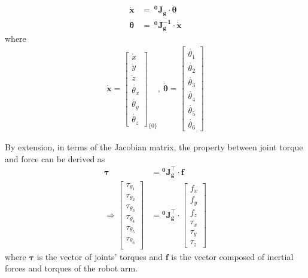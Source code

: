 \begin{equation}
\label{eq:jg0}
\begin{split}
\boldsymbol{\dot{x}} &= \ \mathbf{^0\!J_g} \cdot \boldsymbol{\dot{\theta}} 		\\ 
\boldsymbol{\dot{\theta}} &= \ \mathbf{^0\!J_g^{-1}} \cdot \boldsymbol{\dot{x}}
\end{split}
\end{equation}
where
\begin{equation*}
\begin{split}
\boldsymbol{\dot{x}}
=
\begin{bmatrix}
\dot{x}\\
\dot{y}\\
\dot{z}\\
\dot{\theta _x}\\
\dot{\theta _y}\\
\dot{\theta _z}
\end{bmatrix}_{\!\{0\}}
,\ 
\boldsymbol{\dot{\theta}}
=
\begin{bmatrix}
\dot{\theta _1} \\ 
\dot{\theta _2} \\ 
\dot{\theta _3} \\ 
\dot{\theta _4} \\ 
\dot{\theta _5} \\ 
\dot{\theta _6} 
\end{bmatrix}
\end{split}
\end{equation*}
\par
By extension, in terms of the Jacobian matrix, the property between joint torque and force can be derived as
\begin{equation}
\begin{split}
\boldsymbol{\tau } &= \mathbf{^0\!J^\top _g} \cdot \boldsymbol{f}	\\
\Rightarrow
\begin{bmatrix}
\tau_{\theta _1} \\ 
\tau_{\theta _2} \\ 
\tau_{\theta _3} \\ 
\tau_{\theta _4} \\ 
\tau_{\theta _5} \\ 
\tau_{\theta _6} \\ 
\end{bmatrix}
&=
\mathbf{^0\!J^\top _g} 
\cdot
\begin{bmatrix}
f_x \\ 
f_y \\ 
f_z \\ 
\tau_{x} \\ 
\tau_{y} \\ 
\tau_{z}
\end{bmatrix}
\end{split}
\end{equation}
where $\boldsymbol{\tau }$ is the vector of joints' torques and $\boldsymbol{f}$ is the vector composed of inertial forces and torques of the robot arm.
